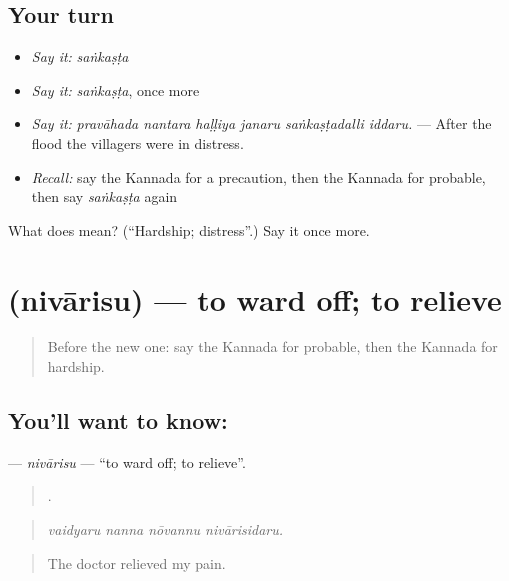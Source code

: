 \subsection*{Your turn}
\begin{itemize}
\raggedright
  \item \emph{Say it:} \emph{saṅkaṣṭa}
  \item \emph{Say it:} \emph{saṅkaṣṭa}, once more
  \item \emph{Say it:} \emph{pravāhada nantara haḷḷiya janaru saṅkaṣṭadalli iddaru.} — After the flood the villagers were in distress.
  \item \emph{Recall:} say the Kannada for a precaution, then the Kannada for probable, then say \emph{saṅkaṣṭa} again
\end{itemize}

\begin{tcolorbox}[breakable,colback=teal!4,colframe=teal!35!black,title={Before you move on}]
What does  mean? (\textquotedblleft{}Hardship; distress\textquotedblright{}.) Say it once more.
\end{tcolorbox}
\section[\texorpdfstring{\kn{ನಿವಾರಿಸು} (nivārisu)}{ನಿವಾರಿಸು (nivārisu)}]{ (nivārisu) — to ward off; to relieve}

\label{lesson:KA-C412-nivarisu}



\begin{quote}
Before the new one: say the Kannada for probable, then the Kannada for hardship.
\end{quote}

\subsection*{You'll want to know: }
\textbf{} — \emph{nivārisu} — \textquotedblleft{}to ward off; to relieve\textquotedblright{}.

\begin{quote}
   .
\end{quote}

\begin{quote}
\emph{vaidyaru nanna nōvannu nivārisidaru.}
\end{quote}

\begin{quote}
The doctor relieved my pain.
\end{quote}

